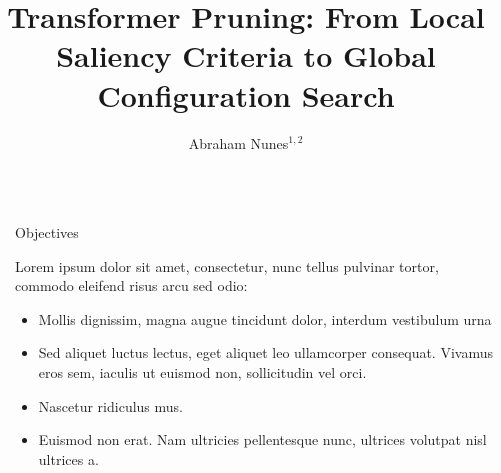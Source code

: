 \documentclass[final]{beamer}
\title{Transformer Pruning: From Local Saliency Criteria to Global Configuration Search} %
\author{Abraham Nunes$^{1,2}$} %
\institute{$^{1}$First Institution Here \\ [0.5ex]
		   $^{2}$Second Institution Here} %
\newlength{\sepwid}
\newlength{\onecolwid}
\begin{document}

\setlength{\belowcaptionskip}{2ex} %
\setlength\belowdisplayshortskip{2ex} %

\begin{frame}[t] %

\begin{columns}[t] %

\begin{column}{\sepwid}\end{column} %

\begin{column}{\onecolwid} %



\begin{alertblock}{Objectives}

Lorem ipsum dolor sit amet, consectetur, nunc tellus pulvinar tortor, commodo eleifend risus arcu sed odio:
\begin{itemize}
\item Mollis dignissim, magna augue tincidunt dolor, interdum vestibulum urna
\item Sed aliquet luctus lectus, eget aliquet leo ullamcorper consequat. Vivamus eros sem, iaculis ut euismod non, sollicitudin vel orci.
\item Nascetur ridiculus mus.  
\item Euismod non erat. Nam ultricies pellentesque nunc, ultrices volutpat nisl ultrices a.
\end{itemize}

\end{alertblock}


\end{column}
\end{columns}
\end{frame}
\end{document}
